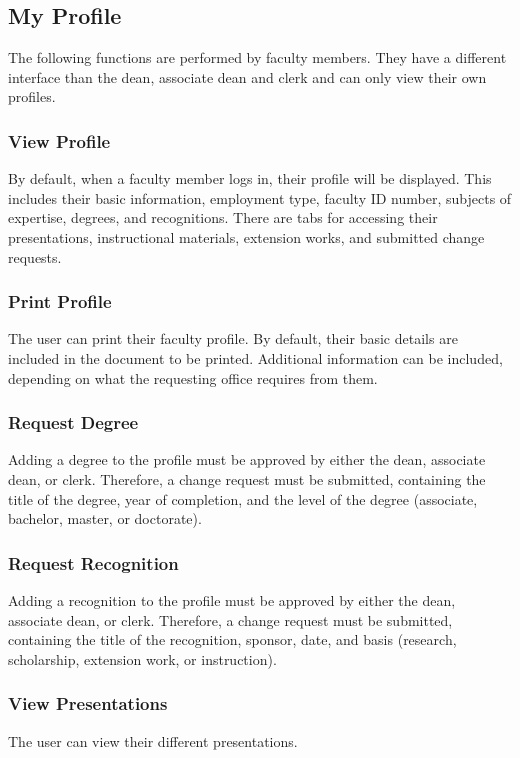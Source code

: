     \subsection{My Profile}
    The following functions are performed by faculty members. They have a different interface than the dean, associate dean and clerk and can only view their own profiles.
        
        \subsubsection{View Profile}
        By default, when a faculty member logs in, their profile will be displayed. This includes their basic information, employment type, faculty ID number, subjects of expertise, degrees, and recognitions. There are tabs for accessing their presentations, instructional materials, extension works, and submitted change requests.
        
        \subsubsection{Print Profile}
        The user can print their faculty profile. By default, their basic details are included in the document to be printed. Additional information can be included, depending on what the requesting office requires from them.
        
        \subsubsection{Request Degree}
        Adding a degree to the profile must be approved by either the dean, associate dean, or clerk. Therefore, a change request must be submitted, containing the title of the degree, year of completion, and the level of the degree (associate, bachelor, master, or doctorate).
        
        \subsubsection{Request Recognition}
        Adding a recognition to the profile must be approved by either the dean, associate dean, or clerk. Therefore, a change request must be submitted, containing the title of the recognition, sponsor, date, and basis (research, scholarship, extension work, or instruction).
        
        \subsubsection{View Presentations}
        The user can view their different presentations.
        
